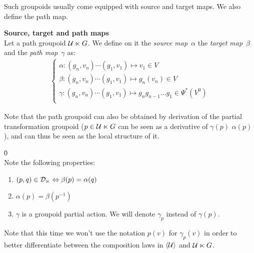 Such groupoids usually come equipped with source and target maps. We also define the path map.

\begin{definition}\textbf{Source, target and path maps}\\
Let a path groupoid $\mathcal{U} \ltimes G$. We define on it the \emph{source map}~$\alpha$ the \emph{target map}~$\beta$ and the \emph{path map}~$\gamma$ as:
\begin{gather*}
\begin{cases}
  \alpha: (g_n,v_n) \cdots (g_1,v_1) \mapsto v_1 \in V\\
  \beta: (g_n,v_n) \cdots (g_1,v_1) \mapsto g_n(v_n) \in V\\
  \gamma: (g_n,v_n) \cdots (g_1,v_1) \mapsto g_ng_{n-1}\ldots g_1 \in \Psi^*(V^0)\\
\end{cases}
\end{gather*}
\end{definition}

\begin{remark}Note that the path groupoid can also be obtained by derivation of the partial transformation groupoid (\ie $p \in \mathcal{U} \ltimes G$ can be seen as a derivative of $\gamma(p)$ \wrt $\alpha(p)$), and can thus be seen as the local structure of it.
\end{remark}

\begin{lemma}\h{0}\\
Note the following properties:
\begin{enumerate}
  \item $(p,q) \in \mathcal{D}_{\ltimes} \Leftrightarrow \beta(p) = \alpha(q)$
  \item $\alpha(p) = \beta(p^{-1})$
  \item $\gamma$ is a groupoid partial action. We will denote $\gamma_p$ instead of $\gamma(p)$. \label{enum:3}
\end{enumerate}
\end{lemma}

\begin{remark}
Note that this time we won't use the notation $p(v)$ for $\gamma_p(v)$ in order to better differentiate between the composition laws in $\langle \mathcal{U} \rangle$ and $\mathcal{U} \ltimes G$.
\end{remark}


